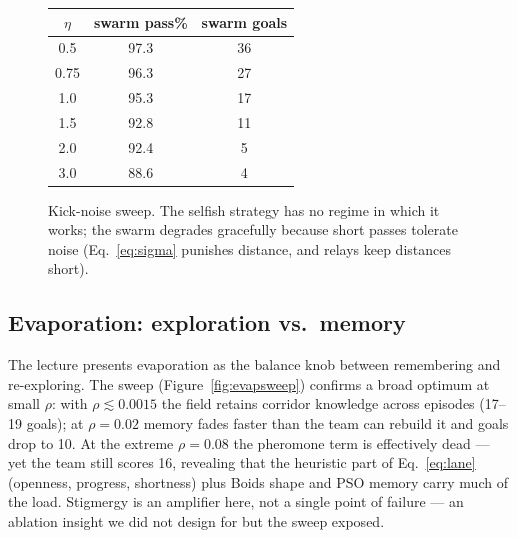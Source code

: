 \documentclass[11pt,a4paper]{article}
\begin{document}
\begin{figure}[H]
\centering
{}%
\hfill
\begin{minipage}[b]{0.4\textwidth}
\centering
\small
\begin{tabular}{@{}ccc@{}}
\toprule
$\eta$ & swarm pass\% & swarm goals\\
\midrule
0.5 & 97.3 & 36\\
0.75 & 96.3 & 27\\
1.0 & 95.3 & 17\\
1.5 & 92.8 & 11\\
2.0 & 92.4 & 5\\
3.0 & 88.6 & 4\\
\bottomrule
\end{tabular}
\vspace{6mm}
\end{minipage}
\caption{Kick-noise sweep. The selfish strategy has no regime in which it works; the swarm
degrades gracefully because short passes tolerate noise (Eq.~\eqref{eq:sigma} punishes
distance, and relays keep distances short).}
\label{fig:noise}
\end{figure}

\subsection{Evaporation: exploration vs.\ memory}

The lecture presents evaporation as the balance knob between remembering and re-exploring.
The sweep (Figure~\ref{fig:evapsweep}) confirms a broad optimum at small $\rho$: with
$\rho \lesssim 0.0015$ the field retains corridor knowledge across episodes (17--19 goals);
at $\rho = 0.02$ memory fades faster than the team can rebuild it and goals drop to 10. At the
extreme $\rho = 0.08$ the pheromone term is effectively dead --- yet the team still scores 16,
revealing that the heuristic part of Eq.~\eqref{eq:lane} (openness, progress, shortness) plus
Boids shape and PSO memory carry much of the load. Stigmergy is an amplifier here, not a
single point of failure --- an ablation insight we did not design for but the sweep exposed.
\end{document}
